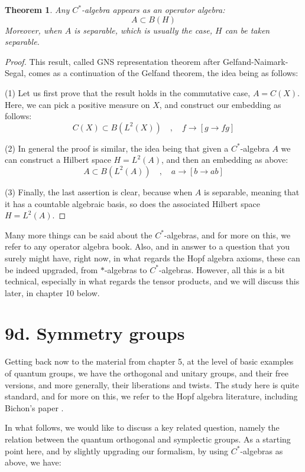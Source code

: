 \documentclass[12pt]{amsbook}
\newtheorem{theorem}{Theorem}[chapter]
\begin{document}
\begin{theorem}
Any $C^*$-algebra appears as an operator algebra:
$$A\subset B(H)$$
Moreover, when $A$ is separable, which is usually the case, $H$ can be taken separable.
\end{theorem}

\begin{proof}
This result, called GNS representation theorem after Gelfand-Naimark-Segal, comes as a continuation of the Gelfand theorem, the idea being as follows:

\medskip

(1) Let us first prove that the result holds in the commutative case, $A=C(X)$. Here, we can pick a positive measure on $X$, and construct our embedding as follows:
$$C(X)\subset B(L^2(X))\quad,\quad f\to[g\to fg]$$

(2) In general the proof is similar, the idea being that given a $C^*$-algebra $A$ we can construct a Hilbert space $H=L^2(A)$, and then an embedding as above:
$$A\subset B(L^2(A))\quad,\quad a\to[b\to ab]$$

(3) Finally, the last assertion is clear, because when $A$ is separable, meaning that it has a countable algebraic basis, so does the associated Hilbert space $H=L^2(A)$.
\end{proof}

Many more things can be said about the $C^*$-algebras, and for more on this, we refer to any operator algebra book. Also, and in answer to a question that you surely might have, right now, in what regards the Hopf algebra axioms, these can be indeed upgraded, from $*$-algebras to $C^*$-algebras. However, all this is a bit technical, especially in what regards the tensor products, and we will discuss this later, in chapter 10 below.

\section*{9d. Symmetry groups}

Getting back now to the material from chapter 5, at the level of basic examples of quantum groups, we have the orthogonal and unitary groups, and their free versions, and more generally, their liberations and twists. The study here is quite standard, and for more on this, we refer to the Hopf algebra literature, including Bichon's paper \cite{bi3}.

\bigskip

In what follows, we would like to discuss a key related question, namely the relation between the quantum orthogonal and symplectic groups. As a starting point here, and by slightly upgrading our formalism, by using $C^*$-algebras as above, we have:
\end{document}
